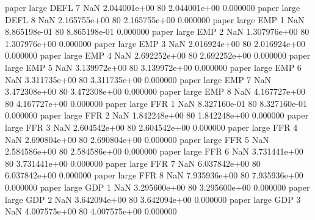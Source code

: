             paper      large     DEFL                 7                  NaN 2.044001e+00 80   2.044001e+00           0.000000
            paper      large     DEFL                 8                  NaN 2.165755e+00 80   2.165755e+00           0.000000
            paper      large      EMP                 1                  NaN 8.865198e-01 80   8.865198e-01           0.000000
            paper      large      EMP                 2                  NaN 1.307976e+00 80   1.307976e+00           0.000000
            paper      large      EMP                 3                  NaN 2.016924e+00 80   2.016924e+00           0.000000
            paper      large      EMP                 4                  NaN 2.692252e+00 80   2.692252e+00           0.000000
            paper      large      EMP                 5                  NaN 3.139972e+00 80   3.139972e+00           0.000000
            paper      large      EMP                 6                  NaN 3.311735e+00 80   3.311735e+00           0.000000
            paper      large      EMP                 7                  NaN 3.472308e+00 80   3.472308e+00           0.000000
            paper      large      EMP                 8                  NaN 4.167727e+00 80   4.167727e+00           0.000000
            paper      large      FFR                 1                  NaN 8.327160e-01 80   8.327160e-01           0.000000
            paper      large      FFR                 2                  NaN 1.842248e+00 80   1.842248e+00           0.000000
            paper      large      FFR                 3                  NaN 2.604542e+00 80   2.604542e+00           0.000000
            paper      large      FFR                 4                  NaN 2.690804e+00 80   2.690804e+00           0.000000
            paper      large      FFR                 5                  NaN 2.584586e+00 80   2.584586e+00           0.000000
            paper      large      FFR                 6                  NaN 3.731441e+00 80   3.731441e+00           0.000000
            paper      large      FFR                 7                  NaN 6.037842e+00 80   6.037842e+00           0.000000
            paper      large      FFR                 8                  NaN 7.935936e+00 80   7.935936e+00           0.000000
            paper      large      GDP                 1                  NaN 3.295600e+00 80   3.295600e+00           0.000000
            paper      large      GDP                 2                  NaN 3.642094e+00 80   3.642094e+00           0.000000
            paper      large      GDP                 3                  NaN 4.007575e+00 80   4.007575e+00           0.000000
